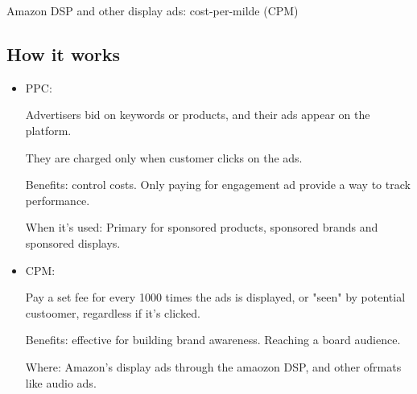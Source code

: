 \documentclass{article}
\begin{document}
Amazon DSP and other display ads: cost-per-milde (CPM)

\subsection{How it works}
\begin{itemize}
    \item PPC:
    
    Advertisers bid on keywords or products, and their ads appear on the platform.

    They are charged only when customer clicks on the ads.

    Benefits: control costs. Only paying for engagement ad provide a way to track performance.

    When it's used: Primary for sponsored products, sponsored brands and sponsored displays.

    \item CPM:
    
    Pay a set fee for every 1000 times the ads is displayed, or "seen" by potential custoomer, regardless if it's clicked.

    Benefits: effective for building brand awareness. Reaching a board audience.

    Where: Amazon's display ads through the amaozon DSP, and other ofrmats like audio ads.
\end{itemize}

% 
\end{document}
